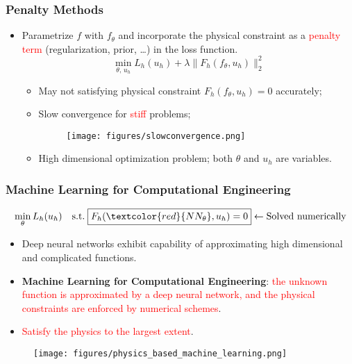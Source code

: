 \documentclass[usenames,dvipsnames]{beamer}
\begin{document}
\begin{frame}
	\frametitle{Penalty Methods}
	
	\begin{itemize}
		\item Parametrize $f$ with $f_\theta$ and incorporate the physical constraint as a \textcolor{red}{penalty term} (regularization, prior, \ldots) in the loss function.
		\begin{equation*}
	\min_{\theta,\,u_h} L_h(u_h) + \lambda\|F_h(f_\theta, u_h)\|_2^2
		\end{equation*}
		\begin{itemize}
			\item May not satisfying physical constraint $F_h(f_\theta, u_h)=0$ accurately;
			\item Slow convergence for \textcolor{red}{stiff} problems;
			\begin{figure}[hbt]
				\texttt{[image: figures/slowconvergence.png]}
			\end{figure}
			
			
			\item High dimensional optimization problem; both $\theta$ and $u_h$ are variables.
		\end{itemize}
	\end{itemize}
\end{frame}

\begin{frame}
	\frametitle{Machine Learning for Computational Engineering}
	$$\min_{\theta} L_h(u_h) \quad \mathrm{s.t.}\;\boxed{F_h(\textcolor{red}{NN_\theta}, u_h) = 0} \leftarrow \mbox{Solved numerically}$$
	\vspace{-0.5cm}
	\begin{itemize}
		\item Deep neural networks exhibit capability of approximating high dimensional and complicated functions. 
		\item \textbf{Machine Learning for Computational Engineering}: \textcolor{red}{the unknown function is approximated by a deep neural network, and the physical constraints are enforced by numerical schemes}.
		\item \textcolor{red}{Satisfy the physics to the largest extent}.
	\end{itemize}
	\begin{figure}[hbt]
  \texttt{[image: figures/physics\_based\_machine\_learning.png]}
\end{figure}
\end{frame}
\end{document}
